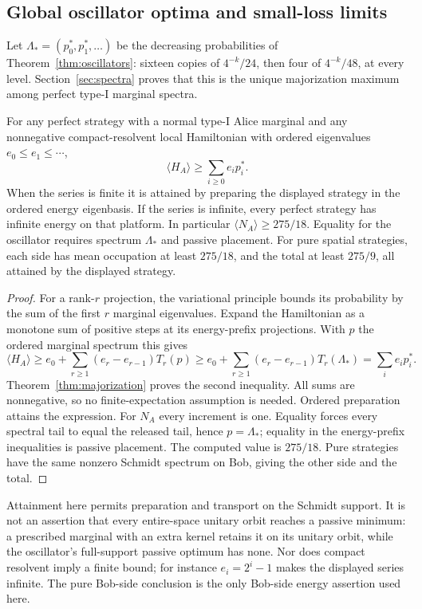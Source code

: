 \subsection{Global oscillator optima and small-loss limits}\label{sec:energy-optima}
Let $\Lambda_*=(p_0^*,p_1^*,\ldots)$ be the decreasing probabilities of Theorem~\ref{thm:oscillators}: sixteen copies of $4^{-k}/24$, then four of $4^{-k}/48$, at every level. Section~\ref{sec:spectra} proves that this is the unique majorization maximum among perfect type-I marginal spectra.

\begin{theorem}\label{thm:energy-minimum}
For any perfect strategy with a normal type-I Alice marginal and any nonnegative compact-resolvent local Hamiltonian with ordered eigenvalues $e_0\le e_1\le\cdots$,
\[
 \langle H_A\rangle\ge\sum_{i\ge0}e_i p_i^*.
\]
When the series is finite it is attained by preparing the displayed strategy in the ordered energy eigenbasis. If the series is infinite, every perfect strategy has infinite energy on that platform. In particular $\langle N_A\rangle\ge275/18$. Equality for the oscillator requires spectrum $\Lambda_*$ and passive placement. For pure spatial strategies, each side has mean occupation at least $275/18$, and the total at least $275/9$, all attained by the displayed strategy.
\end{theorem}
\begin{proof}
For a rank-$r$ projection, the variational principle bounds its probability by the sum of the first $r$ marginal eigenvalues. Expand the Hamiltonian as a monotone sum of positive steps at its energy-prefix projections. With $p$ the ordered marginal spectrum this gives
\[
 \langle H_A\rangle\ge e_0+\sum_{r\ge1}(e_r-e_{r-1})T_r(p)
          \ge e_0+\sum_{r\ge1}(e_r-e_{r-1})T_r(\Lambda_*)
          =\sum_i e_i p_i^*.
\]
Theorem~\ref{thm:majorization} proves the second inequality. All sums are nonnegative, so no finite-expectation assumption is needed. Ordered preparation attains the expression. For $N_A$ every increment is one. Equality forces every spectral tail to equal the released tail, hence $p=\Lambda_*$; equality in the energy-prefix inequalities is passive placement. The computed value is $275/18$. Pure strategies have the same nonzero Schmidt spectrum on Bob, giving the other side and the total.
\end{proof}

Attainment here permits preparation and transport on the Schmidt support. It is not an assertion that every entire-space unitary orbit reaches a passive minimum: a prescribed marginal with an extra kernel retains it on its unitary orbit, while the oscillator's full-support passive optimum has none. Nor does compact resolvent imply a finite bound; for instance $e_i=2^i-1$ makes the displayed series infinite. The pure Bob-side conclusion is the only Bob-side energy assertion used here.

